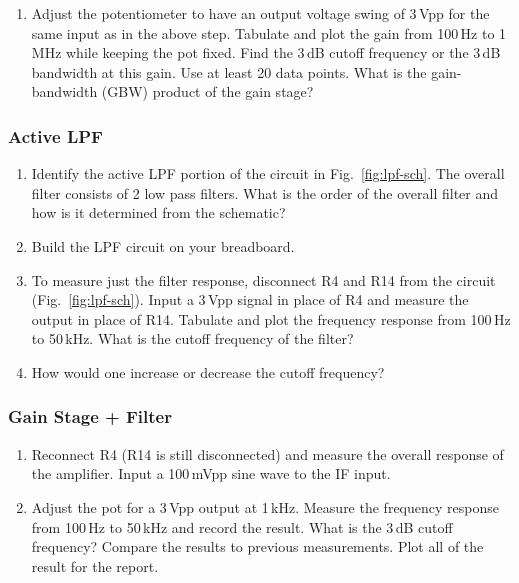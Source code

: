 \documentclass[letterpaper, 11pt]{article}
\begin{document}
\begin{enumerate}
	\item Adjust the potentiometer to have an output voltage swing of 3\,Vpp for the same input as in the above step. 
	Tabulate and plot the gain from 100\,Hz to 1\,MHz while keeping the pot fixed. Find the 3\,dB cutoff frequency or the 3\,dB bandwidth at this gain. Use at least 20 data points. What is the gain-bandwidth (GBW) product of the gain stage? 
	

\end{enumerate}

\subsubsection{Active LPF}
\begin{enumerate}
	\item Identify the active LPF portion of the circuit in Fig.~\ref{fig:lpf-sch}. The overall filter consists of 2 low pass filters. What is the order of the overall filter and how is it determined from the schematic?
	
	\item Build the LPF circuit on your breadboard. 
	
	\item To measure just the filter response, disconnect R4 and R14 from the circuit (Fig.~\ref{fig:lpf-sch}). Input a 3\,Vpp signal in place of R4 and measure the output in place of R14. Tabulate and plot the frequency response from 100\,Hz to 50\,kHz. What is the cutoff frequency of the filter?
	
	\item How would one increase or decrease the cutoff frequency?
	
\end{enumerate}



\subsubsection{Gain Stage + Filter}
\begin{enumerate}
	\item Reconnect R4 (R14 is still disconnected) and measure the overall response of the amplifier. Input a 100\,mVpp sine wave to the IF input. 
	
	\item Adjust the pot for a 3\,Vpp output at 1\,kHz. Measure the frequency response from 100\,Hz to 50\,kHz and record the result. What is the 3\,dB cutoff frequency? Compare the results to previous measurements. Plot all of the result for the report.

\end{enumerate}
\end{document}
